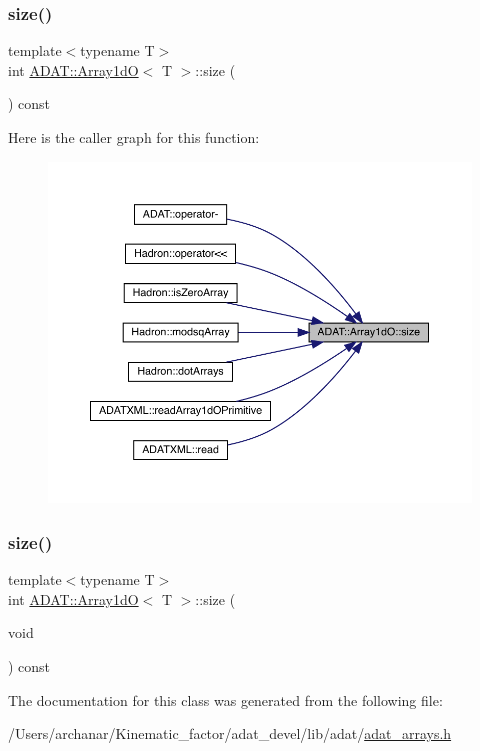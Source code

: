 \subsubsection{\texorpdfstring{size()}{size()}\hspace{0.1cm}{\footnotesize\ttfamily [1/2]}}
{\footnotesize\ttfamily template$<$typename T$>$ \\
int \mbox{\hyperlink{classADAT_1_1Array1dO}{A\+D\+A\+T\+::\+Array1dO}}$<$ T $>$\+::size (\begin{DoxyParamCaption}{ }\end{DoxyParamCaption}) const\hspace{0.3cm}{\ttfamily [inline]}}

Here is the caller graph for this function\+:\nopagebreak
\begin{figure}[H]
\begin{center}
\leavevmode
\includegraphics[width=350pt]{db/d5c/classADAT_1_1Array1dO_a749307d8e42867d6fac39dc9aca84978_icgraph}
\end{center}
\end{figure}
\mbox{\label{classADAT_1_1Array1dO_a749307d8e42867d6fac39dc9aca84978}} 
\subsubsection{\texorpdfstring{size()}{size()}\hspace{0.1cm}{\footnotesize\ttfamily [2/2]}}
{\footnotesize\ttfamily template$<$typename T$>$ \\
int \mbox{\hyperlink{classADAT_1_1Array1dO}{A\+D\+A\+T\+::\+Array1dO}}$<$ T $>$\+::size (\begin{DoxyParamCaption}\item[{void}]{ }\end{DoxyParamCaption}) const\hspace{0.3cm}{\ttfamily [inline]}}



The documentation for this class was generated from the following file\+:\begin{DoxyCompactItemize}
\item 
/\+Users/archanar/\+Kinematic\+\_\+factor/adat\+\_\+devel/lib/adat/\mbox{\hyperlink{lib_2adat_2adat__arrays_8h}{adat\+\_\+arrays.\+h}}\end{DoxyCompactItemize}
